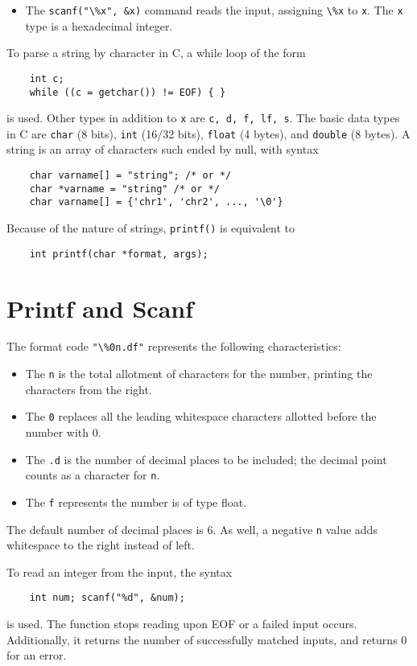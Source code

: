 \documentclass{tufte-book}
\begin{document}
\begin{fullwidth}
\begin{itemize}
    \item The \lstinline{scanf("\%x", &x)} command reads the input, assigning \lstinline{\%x} to \lstinline{x}. The \lstinline{x} type is a hexadecimal integer.
\end{itemize}
To parse a string by character in C, a while loop of the form
\begin{lstlisting}
    int c;
    while ((c = getchar()) != EOF) { }
\end{lstlisting}
is used. Other types in addition to \lstinline{x} are \lstinline{c, d, f, lf, s}. The basic data types in C are \lstinline{char} (8 bits), \lstinline{int} (16/32 bits), \lstinline{float} (4 bytes), and \lstinline{double} (8 bytes). A string is an array of characters such ended by null, with syntax
\begin{lstlisting}
    char varname[] = "string"; /* or */
    char *varname = "string" /* or */
    char varname[] = {'chr1', 'chr2', ..., '\0'}
\end{lstlisting}
Because of the nature of strings, \lstinline{printf()} is equivalent to
\begin{lstlisting}
    int printf(char *format, args);
\end{lstlisting}

\section{Printf and Scanf}
The format code \lstinline{"\%0n.df"} represents the following characteristics:
\begin{itemize}
    \item The \lstinline{n} is the total allotment of characters for the number, printing the characters from the right.
    \item The \lstinline{0} replaces all the leading whitespace characters allotted before the number with 0.
    \item The \lstinline{.d} is the number of decimal places to be included; the decimal point counts as a character for \lstinline{n}.
    \item The \lstinline{f} represents the number is of type float.
\end{itemize}
The default number of decimal places is 6. As well, a negative \lstinline{n} value adds whitespace to the right instead of left.

\bigskip
To read an integer from the input, the syntax
\begin{lstlisting}
    int num; scanf("%d", &num);
\end{lstlisting}
is used. The function stops reading upon EOF or a failed input occurs. Additionally, it returns the number of successfully matched inputs, and returns 0 for an error.


\end{fullwidth}
\end{document}
